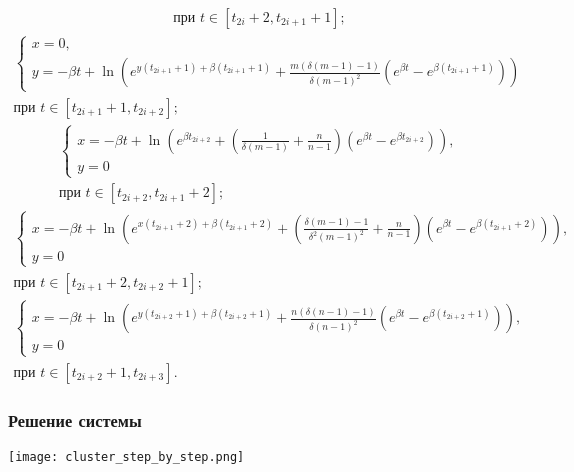 \begin{frame}[allowframebreaks]
\begin{multline*}
		\text{при } t \in [t_{2i} + 2, t_{2i + 1} + 1];
	\end{multline*}
	\begin{multline*}
		\begin{cases}
			x = 0,\\
			y = -\beta t + \ln\left(e^{y(t_{2i + 1} + 1) + \beta(t_{2i + 1} + 1)} + \frac{m (\delta (m - 1) - 1)}{\delta (m - 1)^2} (e^{\beta t} - e^{\beta (t_{2i + 1} + 1)}) \right)
		\end{cases}\\
		\text{при } t \in [t_{2i + 1} + 1, t_{2i + 2}];
	\end{multline*}
	\begin{multline*}
		\begin{cases}
			x = -\beta t + \ln\left(e^{\beta t_{2i + 2}} + \left(\frac{1}{\delta(m - 1)} + \frac{n}{n - 1}\right) (e^{\beta t} - e^{\beta t_{2i + 2}})\right),\\
			y = 0
		\end{cases}\\
		\text{при } t \in [t_{2i + 2}, t_{2i + 1} + 2];
	\end{multline*}
	\begin{multline*}
		\begin{cases}
			x = -\beta t + \ln\left(e^{x(t_{2i + 1} + 2) + \beta (t_{2i + 1} + 2)} + \left(\frac{\delta(m - 1) - 1}{\delta^2 (m - 1)^2} + \frac{n}{n - 1}\right) (e^{\beta t} - e^{\beta (t_{2i + 1} + 2)})\right),\\
			y = 0
		\end{cases}\\
		\text{при } t \in [t_{2i + 1} + 2, t_{2i + 2} + 1];
	\end{multline*}
	\begin{multline*}
		\begin{cases}
			x = -\beta t + \ln\left(e^{y(t_{2i + 2} + 1) + \beta(t_{2i + 2} + 1)} + \frac{n (\delta(n - 1) - 1)}{\delta (n - 1)^2} (e^{\beta t} - e^{\beta (t_{2i + 2} + 1)}) \right),\\
			y = 0
		\end{cases}\\
		\text{при } t \in [t_{2i + 2} + 1, t_{2i + 3}].
	\end{multline*}
	\normalsize
\end{frame}

\begin{frame}
	\frametitle{Решение системы}
	\texttt{[image: cluster\_step\_by\_step.png]}
\end{frame}


